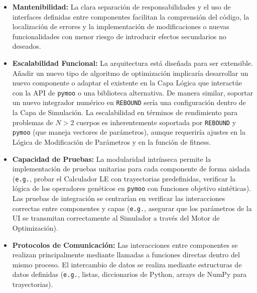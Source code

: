\begin{itemize}
    \item \textbf{Mantenibilidad:} La clara separación de responsabilidades y el uso de interfaces definidas entre componentes facilitan la comprensión del código, la localización de errores y la implementación de modificaciones o nuevas funcionalidades con menor riesgo de introducir efectos secundarios no deseados.
    \item \textbf{Escalabilidad Funcional:} La arquitectura está diseñada para ser extensible. Añadir un nuevo tipo de algoritmo de optimización implicaría desarrollar un nuevo componente o adaptar el existente en la Capa Lógica que interactúe con la API de \texttt{pymoo} o una biblioteca alternativa. De manera similar, soportar un nuevo integrador numérico en \texttt{REBOUND} sería una configuración dentro de la Capa de Simulación. La escalabilidad en términos de rendimiento para problemas de $N > 2$ cuerpos es inherentemente soportada por \texttt{REBOUND} y \texttt{pymoo} (que maneja vectores de parámetros), aunque requeriría ajustes en la Lógica de Modificación de Parámetros y en la función de fitness.
    \item \textbf{Capacidad de Pruebas:} La modularidad intrínseca permite la implementación de pruebas unitarias para cada componente de forma aislada (\texttt{e.g.}, probar el Calculador LE con trayectorias predefinidas, verificar la lógica de los operadores genéticos en \texttt{pymoo} con funciones objetivo sintéticas). Las pruebas de integración se centrarían en verificar las interacciones correctas entre componentes y capas (\texttt{e.g.}, asegurar que los parámetros de la UI se transmitan correctamente al Simulador a través del Motor de Optimización).
    \item \textbf{Protocolos de Comunicación:} Las interacciones entre componentes se realizan principalmente mediante llamadas a funciones directas dentro del mismo proceso. El intercambio de datos se realiza mediante estructuras de datos definidas (\texttt{e.g.}, listas, diccionarios de Python, arrays de NumPy para trayectorias).
\end{itemize}
